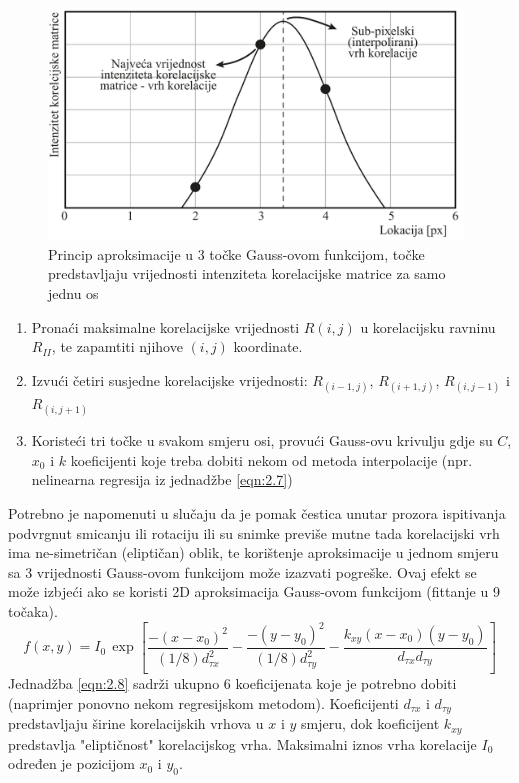 \begin{figure}[h]  
	\centering
	\includegraphics[width=11cm]{./2_DPIV/2_12DetekcijaVrha.pdf} 
	\caption{Princip aproksimacije u 3 točke Gauss-ovom funkcijom, točke predstavljaju vrijednosti intenziteta korelacijske matrice za samo jednu os}
	\label{sl:2.12}
\end{figure}
\begin{enumerate}[label=\textbf{Korak \arabic*:}, leftmargin=*, align=left, topsep=0pt, itemsep=0em]
	\item Pronaći maksimalne korelacijske vrijednosti $R(i, j)$ u korelacijsku ravninu $R_{II}$, te zapamtiti njihove $(i, j)$ koordinate.
	\item Izvući četiri susjedne korelacijske vrijednosti: $R_{(i-1,j)}$, $R_{(i+1,j)}$, $R_{(i,j-1)}$ i $R_{(i,j+1)}$
	\item Koristeći tri točke u svakom smjeru osi, provući Gauss-ovu krivulju gdje su $C$, $x_{0}$ i $k$ koeficijenti koje treba dobiti nekom od metoda interpolacije (npr. nelinearna regresija iz jednadžbe \ref{eqn:2.7})
\end{enumerate}
Potrebno je napomenuti u slučaju da je pomak čestica unutar prozora ispitivanja podvrgnut smicanju ili rotaciju ili su snimke previše mutne tada korelacijski vrh ima ne-simetričan (eliptičan) oblik, te korištenje aproksimacije u jednom smjeru sa 3 vrijednosti Gauss-ovom funkcijom može izazvati pogreške. Ovaj efekt se može izbjeći ako se koristi 2D aproksimacija Gauss-ovom funkcijom (fittanje u 9 točaka).
\begin{equation}
	f(x, y)=I_{0}\, \exp \left[\dfrac{-(x-x_{0})^{2}}{(1/8)d_{\tau x}^{2}}-\dfrac{-(y-y_{0})^{2}}{(1/8)d_{\tau y}^{2}}-\dfrac{k_{xy}(x-x_{0})(y-y_{0})}{d_{\tau x}d_{\tau y}}\right]
	\label{eqn:2.8}
\end{equation}
Jednadžba \ref{eqn:2.8} sadrži ukupno 6 koeficijenata koje je potrebno dobiti (naprimjer ponovno nekom regresijskom metodom). Koeficijenti $d_{\tau x}$ i $d_{\tau y}$ predstavljaju širine korelacijskih vrhova u $x$ i $y$ smjeru, dok koeficijent $k_{xy}$ predstavlja "eliptičnost" korelacijskog vrha. Maksimalni iznos vrha korelacije $I_{0}$ određen je pozicijom $x_{0}$ i $y_{0}$.
\FloatBarrier

